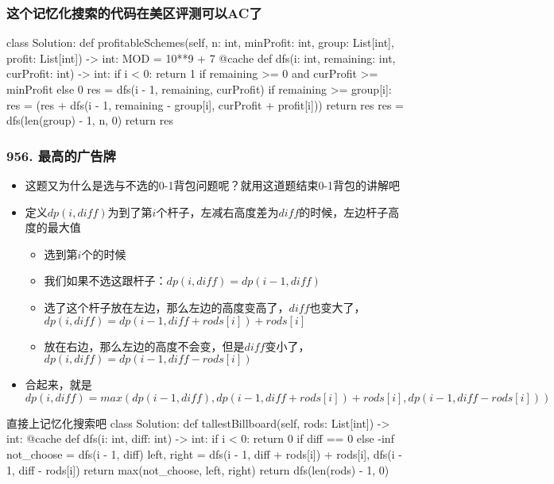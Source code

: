 \begin{frame}[fragile]
  \frametitle{这个记忆化搜索的代码在美区评测可以AC了}
  \begin{codeblock}[language=python]{}
class Solution:
    def profitableSchemes(self, n: int, minProfit: int, group: List[int], profit: List[int]) -> int:
        MOD = 10**9 + 7
        @cache
        def dfs(i: int, remaining: int, curProfit: int) -> int:
            if i < 0:
                return 1 if remaining >= 0 and curProfit >= minProfit else 0
            res = dfs(i - 1, remaining, curProfit)
            if remaining >= group[i]:
                res = (res + dfs(i - 1, remaining - group[i], curProfit + profit[i])) %
            return res
        res = dfs(len(group) - 1, n, 0)
        return res
  \end{codeblock}
\end{frame}


\begin{frame}[fragile]          %
  \frametitle{\textsc{956. 最高的广告牌}}
  \begin{itemize}
    \item 这题又为什么是选与不选的0-1背包问题呢？就用这道题结束0-1背包的讲解吧
    \item 定义$dp(i,diff)$为到了第$i$个杆子，左减右高度差为$diff$的时候，左边杆子高度的最大值
          \begin{itemize}
            \item 选到第$i$个的时候
            \item 我们如果不选这跟杆子：$dp(i,diff)=dp(i-1,diff)$
            \item 选了这个杆子放在左边，那么左边的高度变高了，$diff$也变大了，$dp(i,diff)=dp(i-1,diff + rods[i])+rods[i]$
            \item 放在右边，那么左边的高度不会变，但是$diff$变小了，$dp(i,diff)=dp(i-1,diff-rods[i])$
          \end{itemize}
    \item 合起来，就是$dp(i,diff)=max(dp(i-1,diff),dp(i-1,diff+rods[i])+rods[i],dp(i-1,diff-rods[i]))$
  \end{itemize}
\end{frame}

\begin{frame}[fragile]
  \begin{codeblock}[language=python]{直接上记忆化搜索吧}
class Solution:
    def tallestBillboard(self, rods: List[int]) -> int:
        @cache
        def dfs(i: int, diff: int) -> int:
            if i < 0:
                return 0 if diff == 0 else -inf
            not_choose = dfs(i - 1, diff)
            left, right = dfs(i - 1, diff + rods[i]) + rods[i], dfs(i - 1, diff - rods[i])
            return max(not_choose, left, right)
        return dfs(len(rods) - 1, 0)
  \end{codeblock}
\end{frame}


